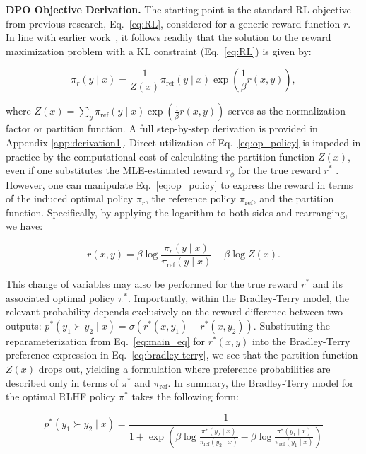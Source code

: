 \textbf{DPO Objective Derivation.} The starting point is the standard RL objective from previous research, Eq.~\ref{eq:RL}, considered for a generic reward function $r$. In line with earlier work~\citep{peters2007reinforcement, peng2019advantage, korbak2022reinforcement, go2023aligning}, it follows readily that the solution to the reward maximization problem with a KL constraint (Eq.~\ref{eq:RL}) is given by:

\begin{equation}\label{eq:op_policy}
    \pi_r(y\mid x) = \frac{1}{Z(x)}\pi_\text{ref}(y\mid x)\exp\left(\frac{1}{\beta}r(x, y)\right),
\end{equation}

where $Z(x) =\sum_{y}\pi_\text{ref}(y\mid x)\exp\left(\frac{1}{\beta}r(x, y)\right)$ serves as the normalization factor or partition function. A full step-by-step derivation is provided in Appendix \ref{app:derivation1}. Direct utilization of Eq.~\ref{eq:op_policy} is impeded in practice by the computational cost of calculating the partition function $Z(x)$, even if one substitutes the MLE-estimated reward $r_{\phi}$ for the true reward $r^*$ \citep{korbak2022reinforcement, go2023aligning}. However, one can manipulate Eq.~\ref{eq:op_policy} to express the reward in terms of the induced optimal policy $\pi_r$, the reference policy $\pi_\text{ref}$, and the partition function. Specifically, by applying the logarithm to both sides and rearranging, we have:

\begin{equation}\label{eq:main_eq}
    r(x,y) =\beta \log \frac{\pi_r(y\mid x)}{\pi_\text{ref}(y\mid x)} + \beta \log Z(x).
\end{equation}

This change of variables may also be performed for the true reward $r^*$ and its associated optimal policy $\pi^*$. Importantly, within the Bradley-Terry model, the relevant probability depends exclusively on the reward difference between two outputs: ${p^*(y_1 \succ y_2 \mid x) = \sigma(r^*(x, y_1) - r^*(x, y_2))}$. Substituting the reparameterization from Eq.~\ref{eq:main_eq} for $r^*(x,y)$ into the Bradley-Terry preference expression in Eq.~\ref{eq:bradley-terry}, we see that the partition function $Z(x)$ drops out, yielding a formulation where preference probabilities are described only in terms of $\pi^*$ and $\pi_\text{ref}$. In summary, the Bradley-Terry model for the optimal RLHF policy $\pi^*$ takes the following form:

\begin{equation}\label{eq:objective}
    p^*(y_1\succ y_2 \mid x)=\frac{1}{1 + \exp\left(\beta \log \frac{\pi^*(y_2\mid x)}{\pi_\text{ref}(y_2\mid x)} - \beta \log \frac{\pi^*(y_1\mid x)}{\pi_\text{ref}(y_1\mid x)}\right)}
\end{equation}

